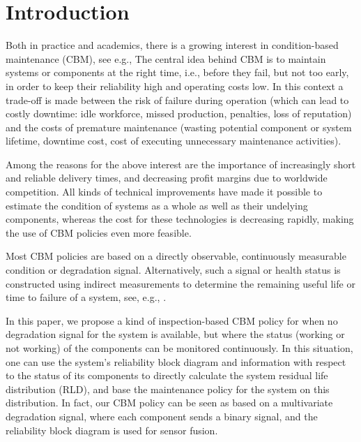 \documentclass[authoryear]{elsarticle}
\begin{document}

\section{Introduction}
\label{intro}

Both in practice and academics,
there is a growing interest in condition-based maintenance (CBM), see e.g.,
\citet[pp.~15--55]{2016:oldekeizer}
The central idea behind CBM is to maintain systems or components at the right time,
i.e., before they fail, but not too early, in order to keep their reliability high and operating costs low.
In this context a trade-off is made between the risk of failure during operation
(which can lead to costly downtime: idle workforce, missed production, penalties, loss of reputation)
and the costs of premature maintenance (wasting potential component or system lifetime,
downtime cost, cost of executing unnecessary maintenance activities).

Among the reasons for the above interest are the importance of increasingly short and
reliable delivery times, and decreasing profit margins due to worldwide competition.
All kinds of technical improvements have made it possible %
to estimate the condition of systems as a whole as well as their undelying components,
whereas the cost for these technologies is decreasing rapidly,
making the use of CBM policies even more feasible.

Most CBM policies are based on a directly observable, continuously measurable condition or degradation signal.
Alternatively, such a signal or health status is constructed
using indirect measurements to determine the remaining useful life or time to failure of a system,
see, e.g., \citet{2014:rul-review, 2011:rul-review-statistical}.

In this paper, we propose a kind of inspection-based CBM policy
for when no degradation signal for the system is available,
but where the status (working or not working) of the components can be monitored continuously.
In this situation, one can use the system's reliability block diagram
and information with respect to the status of its components
to directly calculate the system residual life distribution (RLD),
and base the maintenance policy for the system on this distribution.
In fact, our CBM policy can be seen as based on a multivariate degradation signal,
where each component sends a binary signal, and the reliability block diagram is used for sensor fusion.
\end{document}
